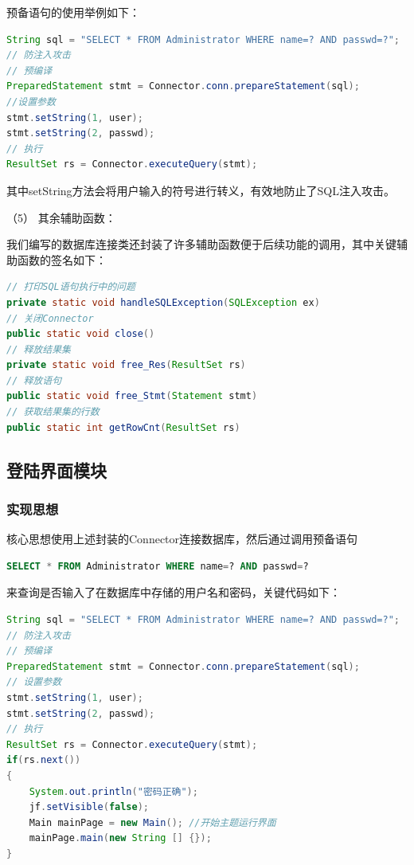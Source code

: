 \documentclass[withoutpreface,bwprint]{cumcmthesis} %
\newcommand{\kuohao}[1]{ \noindent （#1）}
\begin{document}
\noindent
预备语句的使用举例如下：
\begin{lstlisting}[language=java]
String sql = "SELECT * FROM Administrator WHERE name=? AND passwd=?";
// 防注入攻击
// 预编译
PreparedStatement stmt = Connector.conn.prepareStatement(sql);
//设置参数
stmt.setString(1, user);
stmt.setString(2, passwd);
// 执行
ResultSet rs = Connector.executeQuery(stmt);
\end{lstlisting}
其中setString方法会将用户输入的符号进行转义，有效地防止了SQL注入攻击。

\vspace{1em}
\kuohao{5} 其余辅助函数：

我们编写的数据库连接类还封装了许多辅助函数便于后续功能的调用，其中关键辅助函数的签名如下：
\begin{lstlisting}[language=java]
// 打印SQL语句执行中的问题
private static void handleSQLException(SQLException ex)
// 关闭Connector
public static void close()
// 释放结果集
private static void free_Res(ResultSet rs)
// 释放语句
public static void free_Stmt(Statement stmt)
// 获取结果集的行数
public static int getRowCnt(ResultSet rs)
\end{lstlisting}

\subsection{登陆界面模块}

\subsubsection{实现思想}
核心思想使用上述封装的Connector连接数据库，然后通过调用预备语句
\begin{lstlisting}[language=SQL]
SELECT * FROM Administrator WHERE name=? AND passwd=?
\end{lstlisting}
来查询是否输入了在数据库中存储的用户名和密码，关键代码如下：
\begin{lstlisting}[language=java]
String sql = "SELECT * FROM Administrator WHERE name=? AND passwd=?";
// 防注入攻击
// 预编译
PreparedStatement stmt = Connector.conn.prepareStatement(sql);
// 设置参数
stmt.setString(1, user);
stmt.setString(2, passwd);
// 执行
ResultSet rs = Connector.executeQuery(stmt);
if(rs.next())
{
    System.out.println("密码正确");
    jf.setVisible(false);
    Main mainPage = new Main(); //开始主题运行界面
    mainPage.main(new String [] {});
}		
\end{lstlisting}
\end{document}
